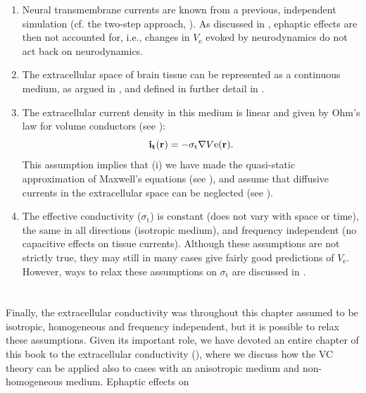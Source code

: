 \begin{enumerate}
\item Neural transmembrane currents are known from a previous, 
independent simulation (cf. the two-step approach,  ). 
As discussed in , ephaptic effects are then
not accounted for, i.e., changes in $V_\mathrm{e}$ evoked by neurodynamics 
do not act back on neurodynamics.

\item The extracellular space of brain tissue can be represented as a continuous 
medium, as argued in , 
and defined in further detail in . 

\item The extracellular current density in this medium is linear and given by 
Ohm's law for volume conductors (see ):
\begin{equation}
{\bf i_t}({\bf r}) = - \sigma_\mathrm{t} \nabla V\mathrm{e}({\bf r}).
\label{eq:VC:ohmici}
\end{equation}
This assumption implies that (i) we have made the quasi-static approximation of Maxwell's equations (see ), and assume that diffusive currents in the extracellular space can be neglected
(see ).

\item The effective conductivity ($\sigma_\mathrm{t}$) is constant (does not vary with space or time), 
the same in all directions (isotropic medium), and frequency independent (no capacitive effects on tissue currents).
Although these assumptions are not strictly true, they may still in many cases give fairly good predictions 
of $V_\mathrm{e}$. However, ways to relax these assumptions on $\sigma_\mathrm{t}$ 
are discussed in .
\end{enumerate}



\section{}
\label{sec:VC:approximations}

Finally, the extracellular conductivity was throughout this chapter assumed to be isotropic, homogeneous and frequency independent, but it is possible to relax these assumptions. Given its important role, we have devoted an entire chapter of this book to the extracellular conductivity (), where we discuss how the VC theory can be applied also to cases with an anisotropic medium and non-homogeneous medium.
Ephaptic effects on 


